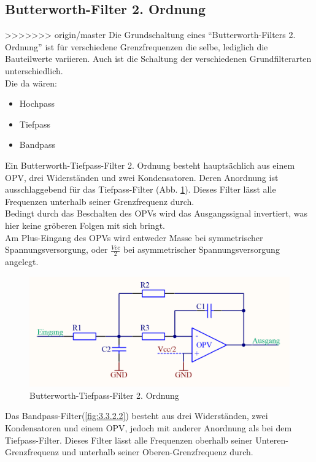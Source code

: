 \subsection{Butterworth-Filter 2. Ordnung}\label{subsec:3.3.2}
>>>>>>> origin/master
Die Grundschaltung eines \enquote{Butterworth-Filters 2. Ordnung} ist für verschiedene Grenzfrequenzen die selbe, lediglich die Bauteilwerte variieren. Auch ist die Schaltung der verschiedenen Grundfilterarten unterschiedlich. \\
Die da wären: 
\begin{itemize}
	\item Hochpass
	\item Tiefpass
	\item Bandpass
\end{itemize}
Ein Butterworth-Tiefpass-Filter 2. Ordnung besteht hauptsächlich aus einem OPV, drei Widerständen und zwei Kondensatoren. Deren Anordnung ist ausschlaggebend für das Tiefpass-Filter (Abb. \ref{fig:3.3.2.1}). Dieses Filter lässt alle Frequenzen unterhalb seiner Grenzfrequenz durch.\\ 
Bedingt durch das Beschalten des OPVs wird das Ausgangssignal invertiert, was hier keine gröberen Folgen mit sich bringt.\\ 
Am Plus-Eingang des OPVs wird entweder Masse bei symmetrischer Spannungsversorgung, oder $\frac{Vcc}{2}$ bei asymmetrischer Spannungsversorgung angelegt.
\begin{figure} [H]
	\centering
	\includegraphics[width=1\textwidth]{img/Print3/TPFilterButterworth2Ordnung.PNG}
	\caption{Butterworth-Tiefpass-Filter 2. Ordnung}
	\label {fig:3.3.2.1}
\end{figure}
Das Bandpass-Filter(\ref{fig:3.3.2.2}) besteht aus drei Widerständen, zwei Kondensatoren und einem OPV, jedoch mit anderer Anordnung als bei dem Tiefpass-Filter.  Dieses Filter lässt alle Frequenzen oberhalb seiner Unteren-Grenzfrequenz und unterhalb seiner Oberen-Grenzfrequenz durch.
